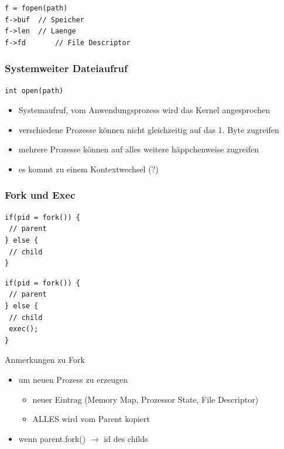		\begin{lstlisting}
f = fopen(path)
f->buf	// Speicher
f->len	// Laenge
f->fd		// File Descriptor
		\end{lstlisting}


	\subsubsection*{Systemweiter Dateiaufruf} %
	\label{ssub:systemweiter_dateiaufruf}

		\lstCcode[Systemaufruf]
		\begin{lstlisting}
int open(path)
		\end{lstlisting}

		\begin{itemize}
			\item Systemaufruf, vom Anwendungsprozess wird das Kernel angesprochen
			\item verschiedene Prozesse können nicht gleichzeitig auf das 1. Byte zugreifen
			\item mehrere Prozesse können auf alles weitere häppchenweise zugreifen
			\item es kommt zu einem Kontextwechsel (?)
		\end{itemize}
	

	\subsubsection*{Fork und Exec} %
	\label{ssub:aufruf_von_fork}
	
		\begin{lstlisting}
if(pid = fork()) {
 // parent
} else {
 // child
}
		\end{lstlisting}

		\begin{lstlisting}
if(pid = fork()) {
 // parent
} else {
 // child
 exec();
}
		\end{lstlisting}

	Anmerkungen zu Fork
		\begin{itemize}
			\item um neuen Prozess zu erzeugen
			\begin{itemize}
				\item neuer Eintrag (Memory Map, Prozessor State, File Descriptor)
				\item ALLES wird vom Parent kopiert
			\end{itemize}
				\item wenn parent.fork() $\rightarrow$ id des childs
		\end{itemize}
		
